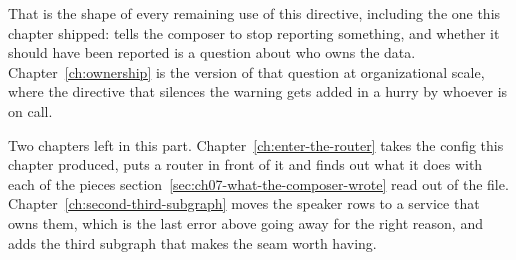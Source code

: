 %
That is the shape of every remaining use of this directive, including the one
this chapter shipped:  tells the composer to stop reporting
something, and whether it should have been reported is a question about who
owns the data. Chapter~\ref{ch:ownership} is the version of that question at
organizational scale, where the directive that silences the warning gets added
in a hurry by whoever is on call.

%
Two chapters left in this part. Chapter~\ref{ch:enter-the-router} takes the
config this chapter produced, puts a router in front of it and finds out what
it does with each of the pieces section~\ref{sec:ch07-what-the-composer-wrote}
read out of the file. Chapter~\ref{ch:second-third-subgraph} moves the speaker
rows to a service that owns them, which is the last error above going away for
the right reason, and adds the third subgraph that makes the seam worth having.
%

